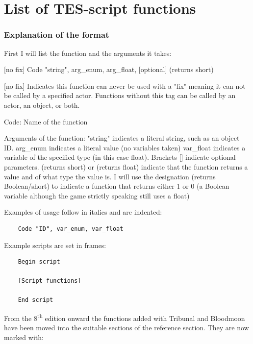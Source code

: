 \section{List of TES-script functions}

\hypertarget{explanation-of-the-format}{%
\subsubsection{Explanation of the
format}\label{explanation-of-the-format}}

First I will list the function and the arguments it takes:

	{[}no fix{]} Code "string", arg\_enum, arg\_float, {[}optional{]}
	(returns short)

\index{{[}no fix{]}}

{[}no fix{]} Indicates this function can never be used with a "fix"
meaning it can not be called by a specified actor. Functions without
this tag can be called by an actor, an object, or both.

Code: Name of the function

Arguments of the function: "string" indicates a literal string, such as
an object ID. arg\_enum indicates a literal value (no variables taken)
var\_float indicates a variable of the specified type (in this case
float). Brackets {[}{]} indicate optional parameters. (returns short) or
(returns float) indicate that the function returns a value and of what
type the value is. I will use the designation (returns Boolean/short) to
indicate a function that returns either 1 or 0 (a Boolean variable
although the game strictly speaking still uses a float)

Examples of usage follow in italics and are indented:

\begin{lstlisting}
	Code "ID", var_enum, var_float
\end{lstlisting}
	
Example scripts are set in frames:

\begin{lstlisting}	
	Begin script
	
	[Script functions]
	
	End script
\end{lstlisting}

From the 8\textsuperscript{th} edition onward the functions added with
Tribunal and Bloodmoon have been moved into the suitable sections of the
reference section. They are now marked with:

